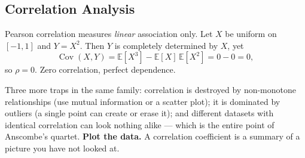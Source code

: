 \subsection{Correlation Analysis}

\begin{cautionbox}
Pearson correlation measures \emph{linear} association only. Let $X$ be uniform
on $[-1,1]$ and $Y = X^2$. Then $Y$ is completely determined by $X$, yet
\[
  \operatorname{Cov}(X,Y) = \mathbb{E}[X^3] - \mathbb{E}[X]\,\mathbb{E}[X^2]
  = 0 - 0 = 0 ,
\]
so $\rho = 0$. Zero correlation, perfect dependence.

Three more traps in the same family: correlation is destroyed by
non-monotone relationships (use mutual information or a scatter plot);
it is dominated by outliers (a single point can create or erase it); and
different datasets with identical correlation can look nothing alike --- which
is the entire point of Anscombe's quartet. \textbf{Plot the data.} A
correlation coefficient is a summary of a picture you have not looked at.
\end{cautionbox}

